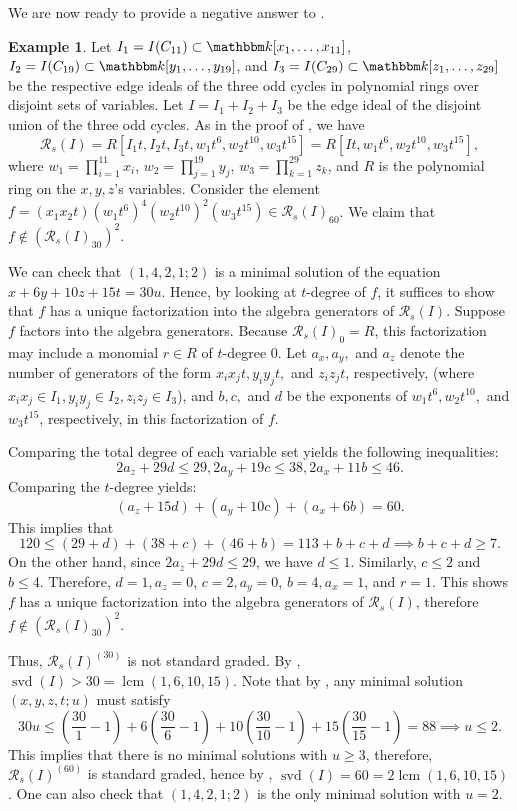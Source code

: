 \documentclass[12pt]{amsart}
\numberwithin{equation}{section}
\theoremstyle{definition}
\newtheorem{example}[theorem]{Example}
\DeclareMathOperator{\lcm}{lcm}
\DeclareMathOperator{\svd}{svd}
\newcommand{\kk}{{\mathbbm k}}
\begin{document}
We are now ready to provide a negative answer to \cite[Question 3.10]{symbolicReesSurvey}.

\begin{example}
    \label{ex.3DisjOddCycles} 
    Let $I_1=I(C_{11}) \subset \kk[x_1,\ldots ,x_{11}]$, $I_2=I(C_{19}) \subset \kk[y_1,\ldots ,y_{19}]$, and $I_3=I(C_{29}) \subset \kk[z_1,\ldots ,z_{29}]$ be the respective edge ideals of the three odd cycles in polynomial rings over disjoint sets of variables. Let $I=I_1+I_2+I_3$ be the edge ideal of the disjoint union of the three odd cycles.
    As in the proof of , we have
    $$\mathcal{R}_s(I) = R \left[I_1 t, I_2 t,  I_3 t,  w_1 t^6,  w_2 t^{10},  w_3 t^{15} \right] = R \left[ I t,  w_1 t^6, w_2 t^{10}, w_3 t^{15} \right],$$
    where $w_1 = \prod_{i=1}^{11} x_i$, $w_2 = \prod_{j=1}^{19} y_j$, $w_3 = \prod_{k=1}^{29} z_k$, and $R$ is the polynomial ring on the $x,y,z$'s variables. 
    Consider the element $f=(x_1x_2t)(w_1t^6)^4(w_2t^{10})^2(w_3t^{15}) \in \mathcal{R}_s(I)_{60}$. We claim that $f \notin (\mathcal{R}_s(I)_{30})^2$. 
    
    We can check that $(1,4,2,1;2)$ is a minimal solution of the equation $x+6y+10z+15t=30u$. Hence, by looking at $t$-degree of $f$, it suffices to show that $f$ has a unique factorization into the algebra generators of $\mathcal{R}_s(I)$.
    Suppose $f$ factors into the algebra generators. 
    Because $\mathcal{R}_s(I)_0 = R$, this factorization may include a monomial $r \in R$ of $t$-degree 0.
    Let $a_x, a_y,$ and $a_z$ denote the number of generators of the form $x_ix_j t, y_iy_j t,$ and $z_iz_j t$, respectively, (where $x_ix_j \in I_1, y_iy_j \in I_2, z_iz_j \in I_3$), and $b, c,$ and $d$ be the exponents of $w_1 t^6, w_2 t^{10},$ and $w_3 t^{15}$, respectively, in this factorization of $f$. 

    Comparing the total degree of each variable set yields the following inequalities:
    \[
        2a_z + 29d \le 29 , 2a_y + 19c \le 38, 2a_x + 11b \le 46.
    \]
    Comparing the $t$-degree yields:
    $$ (a_z + 15d) + (a_y + 10c) + (a_x + 6b) = 60. $$
    This implies that 
    \[
    120 \le (29+d) + (38+c) + (46+b) = 113+b+c+d \implies b+c+d \ge 7.
    \]
    On the other hand, since $2a_z + 29d \le 29$, we have $d \le 1$. Similarly, $c \le 2$ and $b \le 4$. Therefore, $d=1, a_z=0$, $c=2, a_y=0$, $b=4, a_x=1$, and $r=1$. This shows $f$ has a unique factorization into the algebra generators of $\mathcal{R}_s(I)$, therefore $f \notin (\mathcal{R}_s(I)_{30})^2$.
    
    Thus, $\mathcal{R}_s(I)^{(30)}$ is not standard graded. By , $\svd(I)>30 = \lcm(1,6,10,15)$. Note that by , any minimal solution $(x,y,z,t;u)$ must satisfy 
    \[
    30u \le \left(\frac{30}{1}-1 \right) +6\left(\frac{30}{6}-1 \right) + 10\left(\frac{30}{10}-1 \right) +15\left(\frac{30}{15}-1 \right) = 88 \implies u\le 2.
    \]
    This implies that there is no minimal solutions with $u\ge 3$, therefore, $\mathcal{R}_s(I)^{(60)}$ is standard graded, hence by , $\svd(I)=60=2\lcm(1,6,10,15)$. One can also check that $(1,4,2,1;2)$ is the only minimal solution with $u=2$. 
\end{example}
\end{document}
